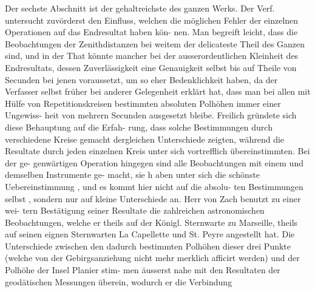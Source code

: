 \documentclass[12pt,a4paper]{article}
\begin{document}
Der sechste Abschnitt ist der gehaltreichste des ganzen Werks. Der Verf. untersucht zuvörderst\newline
den Einfluss, welchen die möglichen Fehler der einzelnen Operationen auf das Endresultat haben kön-\newline
nen. Man begreift leicht, dass die Beobachtungen der Zenithdistanzen bei weitem der delicateste Theil\newline
des Ganzen sind, und in der That könnte mancher bei der ausserordentlichen Kleinheit des Endresultats,\newline
dessen Zuverlässigkeit eine Genauigkeit selbst bis auf Theile von Secunden bei jenen voraussetzt, um\newline
so eher Bedenklichkeit haben, da der Verfasser selbst früher bei anderer Gelegenheit erklärt hat, dass\newline
man bei allen mit Hülfe von Repetitionskreisen bestimmten absoluten Polhöhen immer einer Ungewiss-\newline
heit von mehrern Secunden ausgesetzt bleibe. Freilich gründete sich diese Behauptung auf die Erfah-\newline
rung, dass solche Bestimmungen durch verschiedene Kreise gemacht dergleichen Unterschiede zeigten,\newline
während die Resultate durch jeden einzelnen Kreis unter sich vortrefflich übereinstimmten. Bei der ge-\newline
genwärtigen Operation hingegen sind alle Beobachtungen mit einem und demselben Instrumente ge-\newline
macht, sie h aben unter sich die schönste Uebereinstimmung , und es kommt hier nicht auf die absolu-\newline
ten Bestimmungen selbst , sondern nur auf kleine Unterschiede an. Herr von Zach benutzt zu einer wei-\newline
tern Bestätigung seiner Resultate die zahlreichen astronomischen Beobachtungen, welche er theils auf\newline
der Königl. Sternwarte zu Marseille, theils auf seinen eignen Sternwarten La Capellette und St. Peyre\newline
angestellt hat. Die Unterschiede zwischen den dadurch bestimmten Polhöhen dieser drei Punkte (welche\newline
von der Gebirgsanziehung nicht mehr merklich afficirt werden) und der Polhöhe der Insel Planier stim-\newline
men äusserst nahe mit den Resultaten der geodätischen Messungen überein, wodurch er die Verbindung\newline
\end{document}

